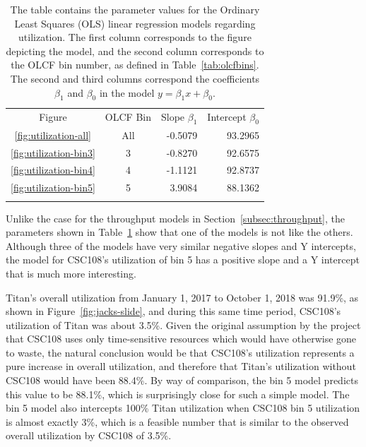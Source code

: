 \begin{table}
\caption{The table contains the parameter values for the Ordinary Least Squares
(OLS) linear regression models regarding utilization. The first column
corresponds to the figure depicting the model, and the second column
corresponds to the OLCF bin number, as defined in Table~\ref{tab:olcfbins}. The second and third columns correspond the coefficients $\beta_1$ and $\beta_0$ in 
the model $y = \beta_{1}x + \beta_0$.}
\label{tab:utilization-params}       %
\begin{tabular}{ccrr}
\hline\noalign{\smallskip}
Figure  & OLCF Bin & Slope $\beta_1$  & Intercept $\beta_0$  \\
\noalign{\smallskip}\hline\noalign{\smallskip}
\ref{fig:utilization-all}    &   All &  -0.5079 &   93.2965 \\
\ref{fig:utilization-bin3}   &   3   &  -0.8270 &   92.6575 \\
\ref{fig:utilization-bin4}   &   4   &  -1.1121 &   92.8737 \\
\ref{fig:utilization-bin5}   &   5   &  3.9084  &   88.1362 \\
\noalign{\smallskip}\hline
\end{tabular}
\end{table}

Unlike the case for the throughput models in Section~\ref{subsec:throughput},
the parameters shown in Table~\ref{tab:utilization-params} show that one of the
models is not like the others. Although three of the models have very similar
negative slopes and Y intercepts, the model for CSC108's utilization of bin 5
has a positive slope and a Y intercept that is much more interesting.

Titan's overall utilization from January 1, 2017 to October 1, 2018 was
91.9\%, as shown in Figure~\ref{fig:jacks-slide}, and during this same time
period, CSC108's utilization of Titan was about 3.5\%. Given the original
assumption by the project that CSC108 uses only time-sensitive resources which
would have otherwise gone to waste, the natural conclusion would be that
CSC108's utilization represents a pure increase in overall utilization, and
therefore that Titan's utilization without CSC108 would have been 88.4\%. By
way of comparison, the bin 5 model predicts this value to be 88.1\%, which is
surprisingly close for such a simple model. The bin 5 model also intercepts
100\% Titan utilization when CSC108 bin 5 utilization is almost exactly 3\%,
which is a feasible number that is similar to the observed overall utilization
by CSC108 of 3.5\%.

